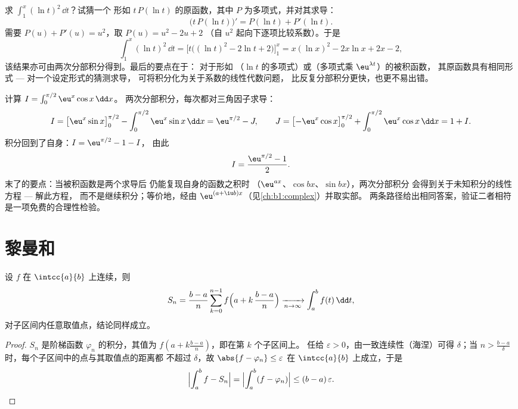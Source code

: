 \begin{example}[猜测、求导、调整]\label{ex:b1:integration:guessdiff}
求 $\int_1^x (\ln t)^2\,\dd t$？试猜一个
形如 $t\,P(\ln t)$ 的原函数，其中 $P$ 为多项式，并对其求导：
\[
\bigl(t\,P(\ln t)\bigr)' = P(\ln t) + P'(\ln t) .
\]
需要 $P(u) + P'(u) = u^2$，取 $P(u) = u^2 - 2u + 2$
（自 $u^2$ 起向下逐项比较系数）。于是
\[
\int_1^x (\ln t)^2\,\dd t
= \bigl[t\bigl((\ln t)^2 - 2\ln t + 2\bigr)\bigr]_1^x
= x(\ln x)^2 - 2x\ln x + 2x - 2 ,
\]
该结果亦可由两次分部积分得到。最后的要点在于：
对于形如
（$\ln t$ 的多项式）或（多项式乘 $\eu^{\lambda t}$）的被积函数，
其原函数具有相同形式 --- 对一个设定形式的猜测求导，
可将积分化为关于系数的线性代数问题，
比反复分部积分更快，也更不易出错。
\end{example}

\begin{example}[回旋镖积分]\label{ex:b1:integration:boomerang}
计算 $I = \int_0^{\pi/2} \eu^x \cos x\,\dd x$。
两次分部积分，每次都对三角因子求导：
\[
I = \bigl[\eu^x \sin x\bigr]_0^{\pi/2}
- \int_0^{\pi/2} \eu^x \sin x\,\dd x
= \eu^{\pi/2} - J,
\qquad
J = \bigl[-\eu^x\cos x\bigr]_0^{\pi/2}
+ \int_0^{\pi/2} \eu^x\cos x\,\dd x = 1 + I .
\]
积分回到了自身：$I = \eu^{\pi/2} - 1 - I$，
由此
\[
I = \frac{\eu^{\pi/2} - 1}{2} .
\]
末了的要点：当被积函数是两个求导后
仍能复现自身的函数之积时
（$\eu^{ax}$、$\cos bx$、$\sin bx$），两次分部积分
会得到关于未知积分的线性方程 --- 解此方程，
而不是继续积分；等价地，经由
$\eu^{(a + \iu b)x}$（见\cref{ch:b1:complex}）并取实部。
两条路径给出相同答案，验证二者相符
是一项免费的合理性检验。
\end{example}

\section{黎曼和}

\begin{theorem}[黎曼和]\label{thm:b1:integration:riemann}
设 $f$ 在 $\intcc{a}{b}$ 上连续，则
\[
S_n = \frac{b - a}{n} \sum_{k=0}^{n-1}
f\Bigl(a + k\,\frac{b-a}{n}\Bigr)
\xrightarrow[n \to \infty]{} \int_a^b f(t)\, \dd t ,
\]
对子区间内任意取值点，结论同样成立。
\end{theorem}

\begin{proof}
$S_n$ 是阶梯函数 $\varphi_n$ 的积分，其值为
$f(a + k\frac{b-a}{n})$，即在第 $k$ 个子区间上。
任给 $\varepsilon > 0$，由一致连续性（海涅）可得 $\delta$；当
$n > \frac{b-a}{\delta}$ 时，每个子区间中的点与其取值点的距离都
不超过 $\delta$，故 $\abs{f - \varphi_n} \leq
\varepsilon$ 在 $\intcc{a}{b}$ 上成立，于是
\[
\Bigl| \int_a^b f - S_n \Bigr|
= \Bigl| \int_a^b (f - \varphi_n) \Bigr|
\leq (b-a)\,\varepsilon . \qedhere
\]
\end{proof}

